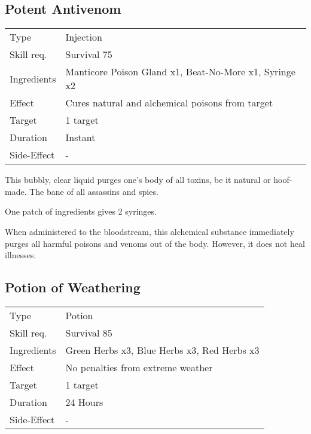 \documentclass[11pt,a4paper,twocolumn]{book}
\begin{document}
\vfill

\subsection*{Potent Antivenom}
{
	\begin{tabu} to 75mm{| X[l,4] | X[l,8] |}
		\hline
		Type 			& Injection													\\
		Skill req.	    & Survival 75 												\\
		Ingredients     & Manticore Poison Gland x1, Beat-No-More x1, Syringe x2	\\
		Effect     		& Cures natural and alchemical poisons from target 			\\
		Target      	& 1 target													\\
		Duration  		& Instant	 												\\
		Side-Effect     & -															\\ \hline
	\end{tabu}
	
}

\medskip

This bubbly, clear liquid purges one's body of all toxins, be it natural or hoof-made. The bane of all assassins and spies.

One patch of ingredients gives 2 syringes.

When administered to the bloodstream, this alchemical substance immediately purges all harmful poisons and venoms out of the body. However, it does not heal illnesses.


\subsection*{Potion of Weathering}
{
	\begin{tabu} to 75mm{| X[l,4] | X[l,8] |}
		\hline
		Type 			& Potion 													\\
		Skill req.	    & Survival 85 												\\
		Ingredients     & Green Herbs x3, Blue Herbs x3, Red Herbs x3				\\
		Effect     		& No penalties from extreme weather			\\
		Target      	& 1 target													\\
		Duration  		& 24 Hours	 												\\
		Side-Effect     & -															\\ \hline
	\end{tabu}
	
}
\end{document}
